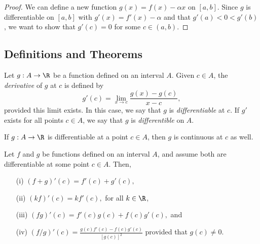 \begin{proof}
    We can define a new function \( g(x) = f(x) - \alpha x  \) on \( [a,b]  \). Since \( g  \) is differentiable on \( [a,b]  \) with \( g'(x)  = f'(x) - \alpha  \) and that \( g'(a) < 0 < g'(b)  \), we want to show that \( g'(c) = 0  \) for some \( c \in (a,b)  \).
\end{proof}

\subsection{Definitions and Theorems}

\begin{tcolorbox}
    \begin{defn}[Differentiability]
    Let \( g : A \to \R  \) be a function defined on an interval \( A  \). Given \( c \in A  \), the \textit{derivative} of \( g  \) at \( c  \) is defined by 
    \[ g'(c) = \lim_{ x \to c } \frac{ g(x) - g(c)  }{ x - c  }, \]
    provided this limit exists. In this case, we say that \( g  \) is \textit{differentiable} at \( c  \). If \( g'  \) exists for all points \( c \in A  \), we say that \( g  \) is \textit{differentible} on \( A  \).
    \end{defn}
\end{tcolorbox}


\begin{tcolorbox}
\begin{thm}
If \( g: A \to \R  \) is differentiable at a point \( c \in A  \), then \( g  \) is continuous at \( c  \) as well.
\end{thm}
\end{tcolorbox}


\begin{tcolorbox}
    \begin{thm}
    Let \( f  \) and \( g  \) be functions defined on an interval \( A  \), and assume both are differentiable at some point \( c \in A \). Then, 
    \begin{enumerate}
        \item[(i)] \( (f+g)'(c) = f'(c) + g'(c), \)
        \item[(ii)] \( (kf)'(c) = kf'(c), \) for all \( k \in \R  \),
        \item[(iii)] \( (fg)'(c) = f'(c)g(c) + f(c)g'(c),  \) and 
        \item[(iv)] \( (f/g)'(c) = \frac{ g(c)f'(c) - f(c)g'(c)  }{ [g(c)]^2 }  \) provided that \( g(c) \neq  0 \).
    \end{enumerate}
    \end{thm}
\end{tcolorbox}

